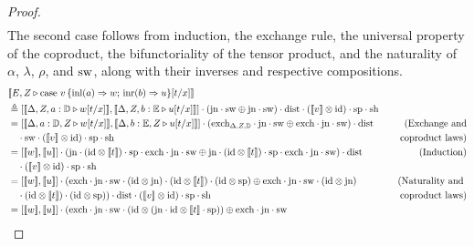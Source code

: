 \documentclass[a4paper,UKenglish,cleveref, autoref, thm-restate]{lipics-v2021}
\begin{document}
\begin{proof}
\begin{align*}
\end{align*}
The second case follows from induction, the exchange rule, the universal property of the coproduct,  the bifunctoriality of the tensor product, and the naturality of $\alpha$, $\lambda$, $\rho$, and $\mathrm{sw}$, along with their inverses and respective compositions.
\begin{align*}
  &[\![E, Z \vljud \text{case } v \,  \{\text{inl} (a) \Rightarrow w ;\, \text{inr} (b) \Rightarrow u\} [t/x]]\!] \\
  & \triangleq \left[[\![ \Delta  , Z ,  a:\typeD \vljud w[t/x] ]\!] ,[\![ \Delta, Z, b:\typeE \vljud u[t/x]  ]\!] \right] \comp (\text{jn}\comp \sw \oplus \text{jn} \comp \sw) \comp \dist  \comp ([\![ v ]\!]   \otimes \text{id})    \comp \text{sp} \comp \text{sh} \hspace{10pt} \\
  & =  \left[[\![ \Delta  ,   a:\typeD, Z \vljud w[t/x] ]\!] ,[\![ \Delta, b:\typeE, Z \vljud u[t/x]  ]\!] \right] \comp ( \text{exch}_{\Delta,Z,\typeD} \comp \text{jn}\comp \sw \oplus  \text{exch} \comp \text{jn} \comp \sw)   \comp \dist   & {(\text{Exchange and}} \\
  &  \hspace{10pt} \comp \sw  \comp ([\![v]\!] \otimes \text{id})  \comp \text{sp} \comp \text{sh} & { \text{coproduct laws})}   \\
  & =   \left[[\![w ]\!] ,[\![ u]\!] \right] \comp ( \text{jn} \comp (\text{id} \otimes [\![t]\!] ) \comp \text{sp} \comp  \text{exch} \comp \text{jn} \comp \sw  \oplus  \text{jn} \comp (\text{id} \otimes [\![ t]\!] ) \comp \text{sp}  \comp \text{exch} \comp\text{jn} \comp \sw ) \comp \dist & {\text{(Induction)}}  \\
  & \hspace{10pt}     \comp ([\![v]\!] \otimes \text{id})  \comp \text{sp} \comp \text{sh} \\
  & =  \left[[\![w ]\!] ,[\![ u]\!] \right] \comp (\text{exch} \comp \text{jn} \comp \sw \comp (\text{id} \otimes  \text{jn} ) \comp (\text{id} \otimes [\![t]\!]) \comp  (\text{id} \otimes \text{sp} ) \oplus \text{exch} \comp \text{jn} \comp \sw \comp (\text{id} \otimes  \text{jn} )   & {(\text{Naturality and }} \\
  & \hspace{10pt} \comp (\text{id} \otimes [\![t]\!]) \comp  (\text{id} \otimes \text{sp} ) )\comp \dist \comp ([\![v]\!] \otimes \text{id})  \comp \text{sp} \comp \text{sh} & {\text{coproduct laws})} \\
  & =  \left[[\![w]\!] ,[\![u]\!] \right] \comp (\text{exch} \comp \text{jn} \comp \sw \comp (\text{id} \otimes  (\text{jn} \comp \text{id} \otimes [\![t]\!] \comp \text{sp}) ) \oplus  \text{exch} \comp \text{jn} \comp \sw  &  \\

\end{align*}
\end{proof}
\end{document}

